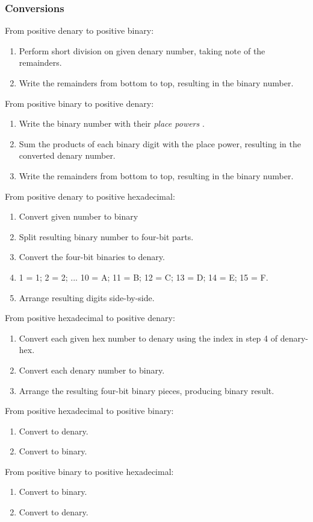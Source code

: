 \documentclass{article}
\begin{document}
\subsubsection*{Conversions}
From positive denary to positive binary:
\begin{enumerate}
	\item Perform short division on given denary number, taking note of the remainders.
	\item Write the remainders from bottom to top, resulting in the binary number.
\end{enumerate}
From positive binary to positive denary:
\begin{enumerate}
	\item Write the binary number with their \textit{place powers} .
	\item Sum the products of each binary digit with the place power, resulting in the
		converted denary number.
	\item Write the remainders from bottom to top, resulting in the binary number.
\end{enumerate}
From positive denary to positive hexadecimal:
\begin{enumerate}
	\item Convert given number to binary
	\item Split resulting binary number to four-bit parts.
	\item Convert the four-bit binaries to denary.
	\item 1 = 1; 2 = 2; ... 10 = A; 11 = B; 12 = C; 13 = D; 14 = E; 15 = F.
	\item Arrange resulting digits side-by-side.
\end{enumerate}
From positive hexadecimal to positive denary:
\begin{enumerate}
	\item Convert each given hex number to denary using the index in step 4 of 
		denary-hex.
	\item Convert each denary number to binary.
	\item Arrange the resulting four-bit binary pieces, producing binary result.
\end{enumerate}
From positive hexadecimal to positive binary:
\begin{enumerate}
	\item Convert to denary.
	\item Convert to binary.
\end{enumerate}
From positive binary to positive hexadecimal:
\begin{enumerate}
	\item Convert to binary.
	\item Convert to denary.
\end{enumerate}
\end{document}

